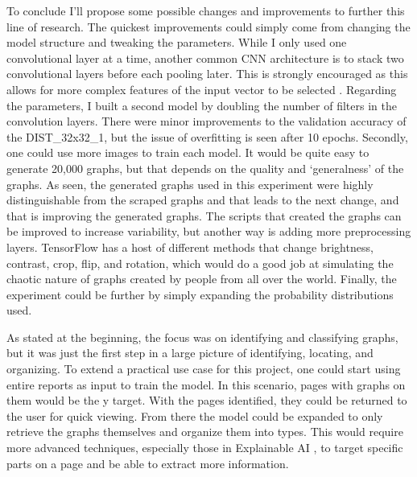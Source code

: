 \documentclass[12pt]{article}
\begin{document}
            To conclude I’ll propose some possible changes and improvements to further this line of research. 
            The quickest improvements could simply come from changing the model structure and tweaking the parameters. 
            While I only used one convolutional layer at a time, 
            another common CNN architecture is to stack two convolutional layers before each pooling later. 
            This is strongly encouraged as this allows for more complex features of the input vector to be selected \cite{oshea2015}. 
            Regarding the parameters, I built a second model by doubling the number of filters in the convolution layers. 
            There were minor improvements to the validation accuracy of the DIST\_32x32\_1, 
            but the issue of overfitting is seen after 10 epochs. Secondly, one could use more images to train each model. 
            It would be quite easy to generate 20,000 graphs, but that depends on the quality and ‘generalness’ of the graphs. 
            As seen, the generated graphs used in this experiment were highly distinguishable from the scraped graphs 
            and that leads to the next change, and that is improving the generated graphs. 
            The scripts that created the graphs can be improved to increase variability, 
            but another way is adding more preprocessing layers. TensorFlow has a host of different methods 
            that change brightness, contrast, crop, flip, and rotation, 
            which would do a good job at simulating the chaotic nature of graphs created by people from all over the world. 
            Finally, the experiment could be further by simply expanding the probability distributions used.
            
            As stated at the beginning, the focus was on identifying and classifying graphs, 
            but it was just the first step in a large picture of identifying, locating, and organizing. 
            To extend a practical use case for this project, one could start using entire reports as input to train the model. 
            In this scenario, pages with graphs on them would be the y target. 
            With the pages identified, they could be returned to the user for quick viewing. 
            From there the model could be expanded to only retrieve the graphs themselves and organize them into types. 
            This would require more advanced techniques, 
            especially those in Explainable AI \cite{kamakshi2023}, 
            to target specific parts on a page and be able to extract more information.
        
    
    \printbibliography[heading=bibintoc, title={References}]
\end{document}
